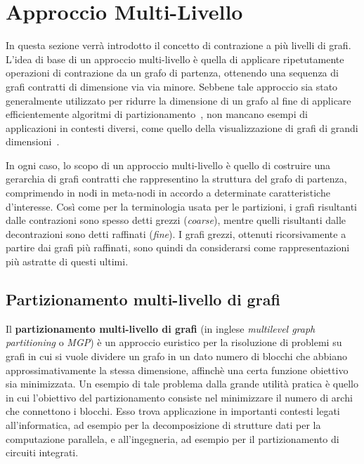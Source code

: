 \section{Approccio Multi-Livello}\label{sec:approccio-multi-livello}
In questa sezione verr\`a introdotto il concetto di contrazione a pi\`u livelli di grafi.
L'idea di base di un approccio multi-livello \`e quella di applicare ripetutamente operazioni di contrazione
da un grafo di partenza, ottenendo una sequenza di grafi contratti di dimensione via via minore.
Sebbene tale approccio sia stato generalmente utilizzato per ridurre la dimensione di un grafo al fine di
applicare efficientemente algoritmi di partizionamento~\cite{DBLP:journals/corr/abs-1012-0006},
non mancano esempi di applicazioni in contesti diversi, come quello della visualizzazione di grafi di grandi
dimensioni~\cite{4069239}.

In ogni caso, lo scopo di un approccio multi-livello \`e quello di costruire una gerarchia di grafi contratti
che rappresentino la struttura del grafo di partenza, comprimendo in nodi in meta-nodi in accordo a determinate
caratteristiche d'interesse.
Così come per la terminologia usata per le partizioni, i grafi risultanti dalle contrazioni sono spesso detti
grezzi (\textit{coarse}), mentre quelli risultanti dalle decontrazioni sono detti raffinati (\textit{fine}).
I grafi grezzi, ottenuti ricorsivamente a partire dai grafi pi\`u raffinati, sono quindi da considerarsi
come rappresentazioni pi\`u astratte di questi ultimi. \newline

\subsection{Partizionamento multi-livello di grafi}\label{subsec:partizionamento-multilivello-di-grafi}
Il \textbf{partizionamento multi-livello di grafi} (in inglese \textit{multilevel graph partitioning} o \textit{MGP})
\`e un approccio euristico per la risoluzione di problemi su grafi in cui si vuole dividere un grafo in un dato numero
di blocchi che abbiano approssimativamente la stessa dimensione, affinch\`e una certa funzione obiettivo sia
minimizzata.
Un esempio di tale problema dalla grande utilità pratica \`e quello in cui l'obiettivo del partizionamento consiste
nel minimizzare il numero di archi che connettono i blocchi.
Esso trova applicazione in importanti contesti legati all'informatica, ad esempio per la decomposizione di strutture
dati per la computazione parallela, e all'ingegneria, ad esempio per il partizionamento di circuiti integrati. \newline

